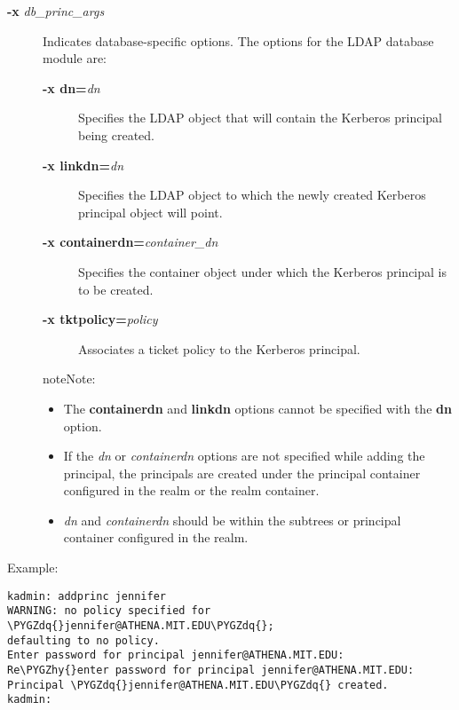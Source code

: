 \documentclass[letterpaper,10pt,english]{sphinxmanual}
\def\PYGZhy{\char`\-}
\def\PYGZdq{\char`\"}
\begin{document}
\begin{description}
\item[{\textbf{-x} \emph{db\_princ\_args}}] \leavevmode
Indicates database-specific options.  The options for the LDAP
database module are:
\begin{description}
\item[{\textbf{-x dn=}\emph{dn}}] \leavevmode
Specifies the LDAP object that will contain the Kerberos
principal being created.

\item[{\textbf{-x linkdn=}\emph{dn}}] \leavevmode
Specifies the LDAP object to which the newly created Kerberos
principal object will point.

\item[{\textbf{-x containerdn=}\emph{container\_dn}}] \leavevmode
Specifies the container object under which the Kerberos
principal is to be created.

\item[{\textbf{-x tktpolicy=}\emph{policy}}] \leavevmode
Associates a ticket policy to the Kerberos principal.

\end{description}

\begin{notice}{note}{Note:}\begin{itemize}
\item {} 
The \textbf{containerdn} and \textbf{linkdn} options cannot be
specified with the \textbf{dn} option.

\item {} 
If the \emph{dn} or \emph{containerdn} options are not specified while
adding the principal, the principals are created under the
principal container configured in the realm or the realm
container.

\item {} 
\emph{dn} and \emph{containerdn} should be within the subtrees or
principal container configured in the realm.

\end{itemize}
\end{notice}

\end{description}

Example:

\begin{Verbatim}[commandchars=\\\{\}]
kadmin: addprinc jennifer
WARNING: no policy specified for \PYGZdq{}jennifer@ATHENA.MIT.EDU\PYGZdq{};
defaulting to no policy.
Enter password for principal jennifer@ATHENA.MIT.EDU:
Re\PYGZhy{}enter password for principal jennifer@ATHENA.MIT.EDU:
Principal \PYGZdq{}jennifer@ATHENA.MIT.EDU\PYGZdq{} created.
kadmin:
\end{Verbatim}
\end{document}
